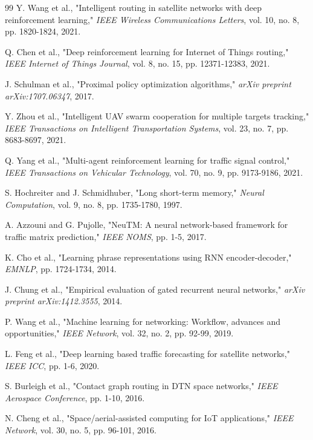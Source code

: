 \begin{thebibliography}{99}
Y. Wang et al., "Intelligent routing in satellite networks with deep reinforcement learning," \textit{IEEE Wireless Communications Letters}, vol. 10, no. 8, pp. 1820-1824, 2021.

Q. Chen et al., "Deep reinforcement learning for Internet of Things routing," \textit{IEEE Internet of Things Journal}, vol. 8, no. 15, pp. 12371-12383, 2021.

J. Schulman et al., "Proximal policy optimization algorithms," \textit{arXiv preprint arXiv:1707.06347}, 2017.

Y. Zhou et al., "Intelligent UAV swarm cooperation for multiple targets tracking," \textit{IEEE Transactions on Intelligent Transportation Systems}, vol. 23, no. 7, pp. 8683-8697, 2021.

Q. Yang et al., "Multi-agent reinforcement learning for traffic signal control," \textit{IEEE Transactions on Vehicular Technology}, vol. 70, no. 9, pp. 9173-9186, 2021.

S. Hochreiter and J. Schmidhuber, "Long short-term memory," \textit{Neural Computation}, vol. 9, no. 8, pp. 1735-1780, 1997.

A. Azzouni and G. Pujolle, "NeuTM: A neural network-based framework for traffic matrix prediction," \textit{IEEE NOMS}, pp. 1-5, 2017.

K. Cho et al., "Learning phrase representations using RNN encoder-decoder," \textit{EMNLP}, pp. 1724-1734, 2014.

J. Chung et al., "Empirical evaluation of gated recurrent neural networks," \textit{arXiv preprint arXiv:1412.3555}, 2014.

P. Wang et al., "Machine learning for networking: Workflow, advances and opportunities," \textit{IEEE Network}, vol. 32, no. 2, pp. 92-99, 2019.

L. Feng et al., "Deep learning based traffic forecasting for satellite networks," \textit{IEEE ICC}, pp. 1-6, 2020.

S. Burleigh et al., "Contact graph routing in DTN space networks," \textit{IEEE Aerospace Conference}, pp. 1-10, 2016.

N. Cheng et al., "Space/aerial-assisted computing for IoT applications," \textit{IEEE Network}, vol. 30, no. 5, pp. 96-101, 2016.


\end{thebibliography}
